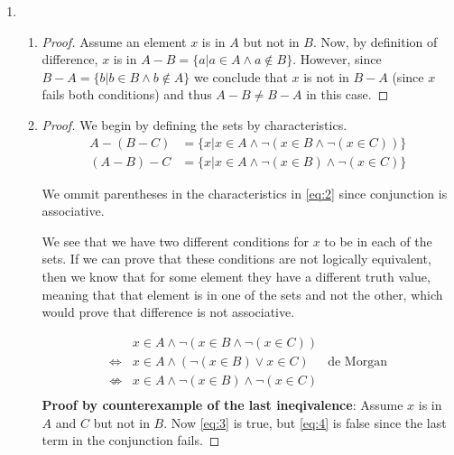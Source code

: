\documentclass{article}
\begin{document}
\begin{enumerate}
    \item
        \begin{enumerate}
            \item 
                \begin{proof}
                    Assume an element $x$ is in $A$ but not in $B$. Now, by definition of difference, $x$ is in  $A - B = \{a | a \in A \land a \not\in B\}$. However, since $B - A = \{b | b \in B \land b \not\in A\}$ we conclude that $x$ is not in $B - A$ (since $x$ fails both conditions) and thus $A - B \not= B - A$ in this case.
                \end{proof}

            \item
                \begin{proof}
                    We begin by defining the sets by characteristics.
                    \begin{align}
                        A - (B - C) &= \{x | x \in A \land \lnot(x \in B  \land \lnot(x \in C))\} \label{eq:1} \\
                        (A - B) - C &= \{x | x \in A \land \lnot(x \in B) \land \lnot(x \in C)\} \label{eq:2}
                    \end{align}
                    
                    We ommit parentheses in the characteristics in \ref{eq:2} since conjunction is associative.

                    We see that we have two different conditions for $x$ to be in each of the sets. If we can prove that these conditions are not logically equivalent, then we know that for some element they have a different truth value, meaning that that element is in one of the sets and not the other, which would prove that difference is not associative.

                    \begin{align}
                        &x \in A \land \lnot(x \in B  \land \lnot(x \in C)) &\\
                        \label{eq:3}\Leftrightarrow &x \in A \land (\lnot(x \in B) \lor x \in C) & \text{de Morgan}\\
                        \label{eq:4}\not\Leftrightarrow & x \in A \land \lnot(x \in B) \land \lnot(x \in C) & \\
                    \end{align}
                    \textbf{Proof by counterexample of the last ineqivalence}: Assume $x$ is in $A$ and $C$ but not in $B$. Now \ref{eq:3} is true, but \ref{eq:4} is false since the last term in the conjunction fails.
                \end{proof}
        \end{enumerate}


\end{enumerate}
\end{document}
